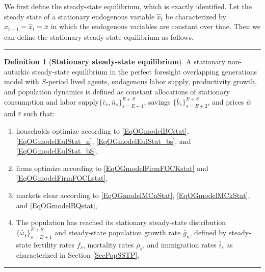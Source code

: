 \documentclass[letterpaper,12pt]{article}
\theoremstyle{definition}
\newtheorem{definition}{Definition} %
\begin{document}
    We first define the steady-state equilibrium, which is exactly identified. Let the steady state of a stationary endogenous variable $\hat{x}_t$ be characterized by $\hat{x}_{t+1}=\hat{x}_t=\bar{x}$ in which the endogenous variables are constant over time. Then we can define the stationary steady-state equilibrium as follows.

    \vspace{5mm}
    \hrule
    \vspace{1mm}
    \begin{definition}[\textbf{Stationary steady-state equilibrium}]\label{DefOGmodelSSEql}
      A stationary non-autarkic steady-state equilibrium in the perfect foresight overlapping generations model with $S$-period lived agents, endogenous labor supply, productivity growth, and population dynamics is defined as constant allocations of stationary consumption and labor supply$\{\bar{c}_s,\bar{n}_s\}_{s=E+1}^{E+S}$, savings $\{\bar{b}_s\}_{s=E+2}^{E+S}$, and prices $\bar{w}$ and $\bar{r}$ such that:
      \begin{enumerate}
        \item households optimize according to \eqref{EqOGmodelBCstat}, \eqref{EqOGmodelEulStat_n}, \eqref{EqOGmodelEulStat_bs}, and \eqref{EqOGmodelEulStat_bS},
        \item firms optimize according to \eqref{EqOGmodelFirmFOCKstat} and \eqref{EqOGmodelFirmFOCLstat},
        \item markets clear according to \eqref{EqOGmodelMCnStat}, \eqref{EqOGmodelMCkStat}, and \eqref{EqOGmodelBQstat},
        \item The population has reached its stationary steady-state distribution $\{\bar{\omega}_s\}_{s=E+1}^{E+S}$ and steady-state population growth rate $\bar{g}_n$, defined by steady-state fertility rates $\bar{f}_s$, mortality rates $\bar{\rho}_s$, and immigration rates $\bar{i}_s$ as characterized in Section \ref{SecPopSSTP}.
      \end{enumerate}
    \end{definition}
    \vspace{0mm}
    \hrule
    \vspace{5mm}
\end{document}

